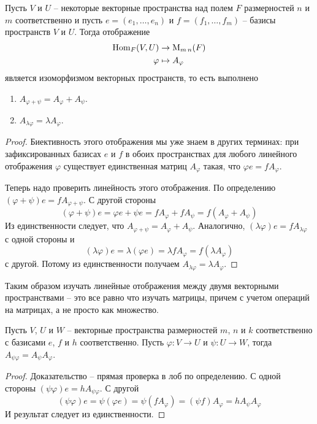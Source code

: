 \begin{claim}
Пусть $V$ и $U$ -- некоторые векторные пространства над полем $F$ размерностей $n$ и $m$ соответственно и пусть $e=(e_1,\ldots,e_n)$ и $f = (f_1,\ldots,f_m)$ -- базисы пространств $V$ и $U$.
Тогда отображение
\begin{align*}
\operatorname{Hom}_F (V,U) &\to \operatorname{M}_{m\,n}(F)\\
\varphi &\mapsto A_\varphi
\end{align*}
является изоморфизмом векторных пространств, то есть выполнено
\begin{enumerate}
\item $A_{\varphi + \psi} = A_\varphi + A_\psi$.

\item $A_{\lambda \varphi} = \lambda A_\varphi$.
\end{enumerate}
\end{claim}
\begin{proof}
Биективность этого отображения мы уже знаем в других терминах: при зафиксированных базисах $e$ и $f$ в обоих пространствах для любого линейного отображения $\varphi$ существует единственная матриц $A_\varphi$ такая, что $\varphi e = f A_\varphi$.

Теперь надо проверить линейность этого отображения.
По определению
$(\varphi + \psi)e = f A_{\varphi + \psi}$.
С другой стороны
\[
(\varphi+\psi)e = \varphi e + \psi e = f A_\varphi + f A_\psi = f(A_\varphi + A_\psi)
\]
Из единственности следует, что $A_{\varphi + \psi} = A_\varphi + A_\psi$.
Аналогично, $(\lambda \varphi) e = f A_{\lambda \varphi}$ с одной стороны и
\[
(\lambda \varphi) e = \lambda (\varphi e) = \lambda f A_\varphi = f (\lambda A_\varphi)
\]
с другой.
Потому из единственности получаем $A_{\lambda \varphi} = \lambda A_\varphi$.
\end{proof}

Таким образом изучать линейные отображения между двумя векторными пространствами -- это все равно что изучать матрицы, причем с учетом операций на матрицах, а не просто как множество.

\begin{claim}
Пусть $V$, $U$ и $W$ -- векторные пространства размерностей $m$, $n$ и $k$ соответственно с базисами $e$, $f$ и $h$ соответственно.
Пусть $\varphi\colon V\to U$ и $\psi \colon U\to W$, тогда $A_{\psi \varphi} = A_\psi A_\varphi$.
\end{claim}
\begin{proof}
Доказательство -- прямая проверка в лоб по определению.
С одной стороны $(\psi \varphi) e = h A_{\psi \varphi}$.
С другой
\[
(\psi\varphi) e = \psi (\varphi e) = \psi (f A_\varphi) = (\psi f) A_\varphi = h A_\psi A_\varphi
\]
И результат следует из единственности.
\end{proof}

